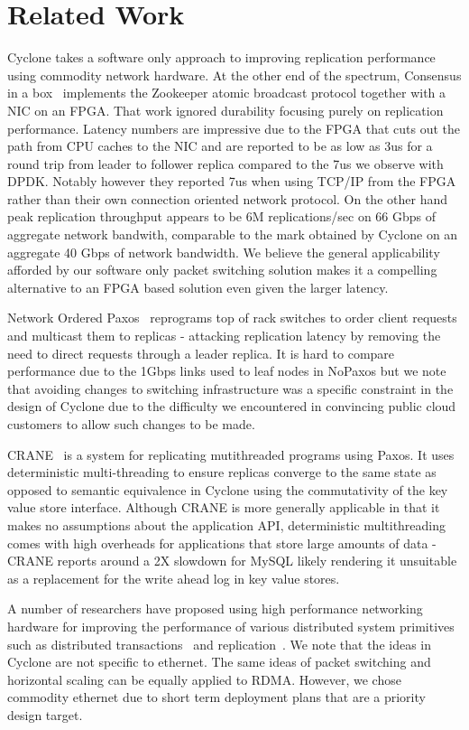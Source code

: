\documentclass[pageno]{jpaper}
\begin{document}
\section{Related Work}

Cyclone takes a software only approach to improving replication performance
using commodity network hardware. At the other end of the spectrum, Consensus in
a box~\cite{consensus_box} implements the Zookeeper atomic broadcast protocol
together with a NIC on an FPGA. That work ignored durability focusing purely on
replication performance. Latency numbers are impressive due to the FPGA that cuts
out the path from CPU caches to the NIC and are reported to be as low as 3us for
a round trip from leader to follower replica compared to the 7us we observe with
DPDK. Notably however they reported 7us when using TCP/IP from the FPGA rather
than their own connection oriented network protocol. On the other hand peak
replication throughput appears to be 6M replications/sec on 66 Gbps of aggregate
network bandwith, comparable to the mark obtained by Cyclone on an aggregate 40
Gbps of network bandwidth. We believe the general applicability afforded by our
software only packet switching solution makes it a compelling alternative to an
FPGA based solution even given the larger latency.

Network Ordered Paxos~\cite{nopaxos} reprograms top of rack switches to order
client requests and multicast them to replicas - attacking replication latency
by removing the need to direct requests through a leader replica. It is hard to
compare performance due to the 1Gbps links used to leaf nodes in NoPaxos but we
note that avoiding changes to switching infrastructure was a specific constraint
in the design of Cyclone due to the difficulty we encountered in convincing
public cloud customers to allow such changes to be made.

{CRANE}~\cite{crane} is a system for replicating mutithreaded programs using
Paxos. It uses deterministic multi-threading to ensure replicas converge to the
same state as opposed to semantic equivalence in Cyclone using the commutativity
of the key value store interface. Although CRANE is more generally applicable in
that it makes no assumptions about the application API, deterministic
multithreading comes with high overheads for applications that store large
amounts of data - CRANE reports around a 2X slowdown for MySQL likely rendering
it unsuitable as a replacement for the write ahead log in key value stores.

A number of researchers have proposed using high performance networking hardware
for improving the performance of various distributed system primitives such as
distributed transactions~\cite{farm} and replication~\cite{dare, mojim}. We note
that the ideas in Cyclone are not specific to ethernet. The same ideas of packet
switching and horizontal scaling can be equally applied to RDMA. However, we
chose commodity ethernet due to short term deployment plans that are a
priority design target. 
\end{document}
